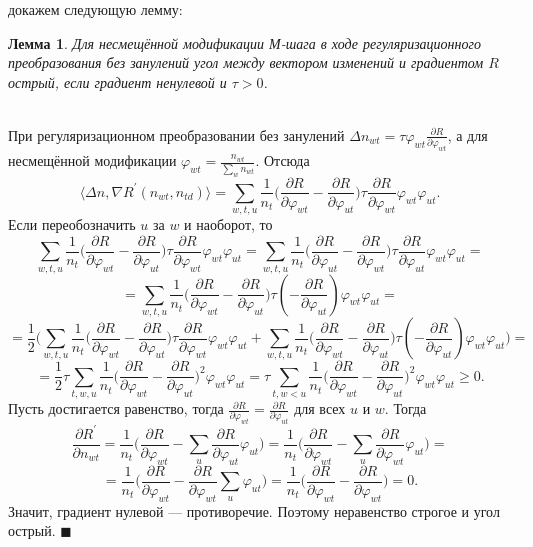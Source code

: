 \documentclass[12pt]{article}
\newtheorem{lemma}[remark]{Лемма}
\newenvironment{Proof} 
	{\par\noindent{\bf Доказательство.}} 
	{\hfill$\blacksquare$}
\renewcommand{\geq}{\geqslant}
\renewcommand{\phi}{\varphi}
\begin{document}
 докажем следующую лемму:
\begin{lemma}           
 Для несмещённой модификации М-шага в ходе регуляризационного преобразования  без занулений угол  между вектором изменений и градиентом $R$ острый, если градиент ненулевой и $\tau > 0$.
\end{lemma}
\begin{Proof}\\
При регуляризационном преобразовании без занулений $\Delta n_{wt} = \tau \phi_{wt} \frac{\partial{R}}{\partial{\phi_{wt}}}$, а для несмещённой модификации $\phi_{wt} = \frac{n_{wt}}{\sum\limits_w n_{wt}}$. Отсюда
\[
\langle \Delta n, \nabla R^{\prime}(n_{wt}, n_{td})\rangle = \sum\limits_{w, t, u}  \frac{1}{n_{t}}  \bigg(  \frac{\partial{R}}{\partial{\phi_{wt}}}  -  \frac{\partial{R}}{\partial{\phi_{ut}}}  \bigg)  \tau \frac{\partial{R}}{\partial{\phi_{wt}}} \phi_{wt} \phi_{ut}.
\]
Если переобозначить $u$ за $w$ и наоборот, то 
\[
\sum\limits_{w, t, u}  \frac{1}{n_{t}}  \bigg(  \frac{\partial{R}}{\partial{\phi_{wt}}}  -  \frac{\partial{R}}{\partial{\phi_{ut}}}  \bigg)  \tau \frac{\partial{R}}{\partial{\phi_{wt}}} \phi_{wt} \phi_{ut}  = \sum\limits_{w, t, u}  \frac{1}{n_{t}}  \bigg(  \frac{\partial{R}}{\partial{\phi_{ut}}}  -  \frac{\partial{R}}{\partial{\phi_{wt}}}  \bigg)  \tau \frac{\partial{R}}{\partial{\phi_{ut}}} \phi_{wt} \phi_{ut} = 
\]
\[
= \sum\limits_{w, t, u}  \frac{1}{n_{t}}  \bigg(  \frac{\partial{R}}{\partial{\phi_{wt}}}  -  \frac{\partial{R}}{\partial{\phi_{ut}}}  \bigg)  \tau \left(-\frac{\partial{R}}{\partial{\phi_{ut}}}\right) \phi_{wt} \phi_{ut} = 
\]
\[
= \frac12 \bigg(\sum\limits_{w, t, u}  \frac{1}{n_{t}}  \bigg(  \frac{\partial{R}}{\partial{\phi_{wt}}}  -  \frac{\partial{R}}{\partial{\phi_{ut}}}  \bigg)  \tau \frac{\partial{R}}{\partial{\phi_{wt}}} \phi_{wt} \phi_{ut} +  \sum\limits_{w, t, u}  \frac{1}{n_{t}}  \bigg(  \frac{\partial{R}}{\partial{\phi_{wt}}}  -  \frac{\partial{R}}{\partial{\phi_{ut}}}  \bigg)  \tau \left(-\frac{\partial{R}}{\partial{\phi_{ut}}}\right) \phi_{wt} \phi_{ut} \bigg)= 
\]
\[
= \frac12 \tau \sum\limits_{t, w, u}  \frac{1}{n_{t}} \bigg(  \frac{\partial{R}}{\partial{\phi_{wt}}}  -  \frac{\partial{R}}{\partial{\phi_{ut}}}  \bigg)^2 \phi_{wt} \phi_{ut} = \tau \sum\limits_{t, w < u}  \frac{1}{n_{t}} \bigg(  \frac{\partial{R}}{\partial{\phi_{wt}}}  -  \frac{\partial{R}}{\partial{\phi_{ut}}}  \bigg)^2 \phi_{wt} \phi_{ut} \geq 0.
\]
Пусть достигается равенство, тогда $\frac{\partial{R}}{\partial{\phi_{wt}}}  =  \frac{\partial{R}}{\partial{\phi_{ut}}}$ для всех $u$ и $w$. Тогда
\[
\frac{\partial{R^{\prime}}}{\partial{n_{wt}}} = \frac{1}{n_t} \bigg( \frac{\partial{R}}{\partial{\phi_{wt}}} - \sum_{u}  \frac{\partial{R}}{\partial{\phi_{ut}}} \phi_{ut} \bigg) = \frac{1}{n_t} \bigg( \frac{\partial{R}}{\partial{\phi_{wt}}} - \sum_{u}  \frac{\partial{R}}{\partial{\phi_{wt}}} \phi_{ut} \bigg) =
\]
\[
=\frac{1}{n_t} \bigg( \frac{\partial{R}}{\partial{\phi_{wt}}} - \frac{\partial{R}}{\partial{\phi_{wt}}} \sum_{u} \phi_{ut} \bigg)  = \frac{1}{n_t} \bigg( \frac{\partial{R}}{\partial{\phi_{wt}}} - \frac{\partial{R}}{\partial{\phi_{wt}}} \bigg) = 0.
\]
Значит, градиент нулевой --- противоречие. Поэтому неравенство строгое и угол острый.
\end{Proof}
\end{document}
